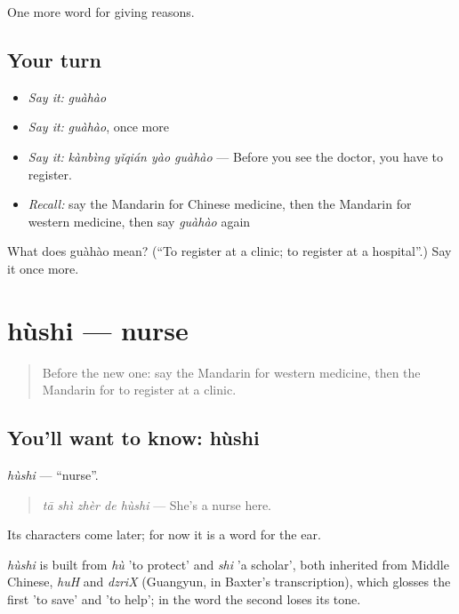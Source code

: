 \begin{grammarlens}[title={What you've built}]
One more word for giving reasons.
\end{grammarlens}

\subsection*{Your turn}
\begin{itemize}
\raggedright
  \item \emph{Say it:} \emph{guàhào}
  \item \emph{Say it:} \emph{guàhào}, once more
  \item \emph{Say it:} \emph{kànbìng yǐqián yào guàhào} — Before you see the doctor, you have to register.
  \item \emph{Recall:} say the Mandarin for Chinese medicine, then the Mandarin for western medicine, then say \emph{guàhào} again
\end{itemize}

\begin{tcolorbox}[breakable,colback=teal!4,colframe=teal!35!black,title={Before you move on}]
What does guàhào mean? (\textquotedblleft{}To register at a clinic; to register at a hospital\textquotedblright{}.) Say it once more.
\end{tcolorbox}
\section[hùshi]{hùshi — nurse}

\label{lesson:ZH-C231-hushi}



\begin{quote}
Before the new one: say the Mandarin for western medicine, then the Mandarin for to register at a clinic.
\end{quote}

\subsection*{You'll want to know: hùshi}
\emph{hùshi} — \textquotedblleft{}nurse\textquotedblright{}.

\begin{quote}
\emph{tā shì zhèr de hùshi} — She's a nurse here.
\end{quote}

Its characters come later; for now it is a word for the ear.

\begin{cousinweb}
\emph{hùshi} is built from \emph{hù} 'to protect' and \emph{shi} 'a scholar', both inherited from Middle Chinese, \emph{huH} and \emph{dzriX} (Guangyun, in Baxter's transcription), which glosses the first 'to save' and 'to help'; in the word the second loses its tone.
\end{cousinweb}

